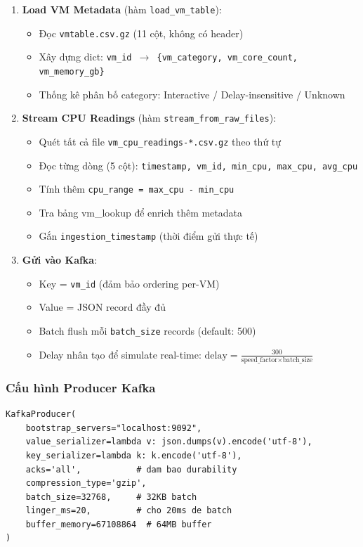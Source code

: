 \documentclass[12pt,a4paper]{article}
\begin{document}
\begin{enumerate}
  \item \textbf{Load VM Metadata} (hàm \texttt{load\_vm\_table}):
    \begin{itemize}
      \item Đọc \texttt{vmtable.csv.gz} (11 cột, không có header)
      \item Xây dựng dict: \texttt{vm\_id $\rightarrow$ \{vm\_category, vm\_core\_count, vm\_memory\_gb\}}
      \item Thống kê phân bố category: Interactive / Delay-insensitive / Unknown
    \end{itemize}

  \item \textbf{Stream CPU Readings} (hàm \texttt{stream\_from\_raw\_files}):
    \begin{itemize}
      \item Quét tất cả file \texttt{vm\_cpu\_readings-*.csv.gz} theo thứ tự
      \item Đọc từng dòng (5 cột): \texttt{timestamp, vm\_id, min\_cpu, max\_cpu, avg\_cpu}
      \item Tính thêm \texttt{cpu\_range = max\_cpu - min\_cpu}
      \item Tra bảng vm\_lookup để enrich thêm metadata
      \item Gắn \texttt{ingestion\_timestamp} (thời điểm gửi thực tế)
    \end{itemize}

  \item \textbf{Gửi vào Kafka}:
    \begin{itemize}
      \item Key = \texttt{vm\_id} (đảm bảo ordering per-VM)
      \item Value = JSON record đầy đủ
      \item Batch flush mỗi \texttt{batch\_size} records (default: 500)
      \item Delay nhân tạo để simulate real-time: $\text{delay} = \frac{300}{\text{speed\_factor} \times \text{batch\_size}}$
    \end{itemize}
\end{enumerate}

\subsubsection{Cấu hình Producer Kafka}
\begin{lstlisting}[style=python, caption={Cấu hình KafkaProducer}]
KafkaProducer(
    bootstrap_servers="localhost:9092",
    value_serializer=lambda v: json.dumps(v).encode('utf-8'),
    key_serializer=lambda k: k.encode('utf-8'),
    acks='all',           # dam bao durability
    compression_type='gzip',
    batch_size=32768,     # 32KB batch
    linger_ms=20,         # cho 20ms de batch
    buffer_memory=67108864  # 64MB buffer
)
\end{lstlisting}
\end{document}
